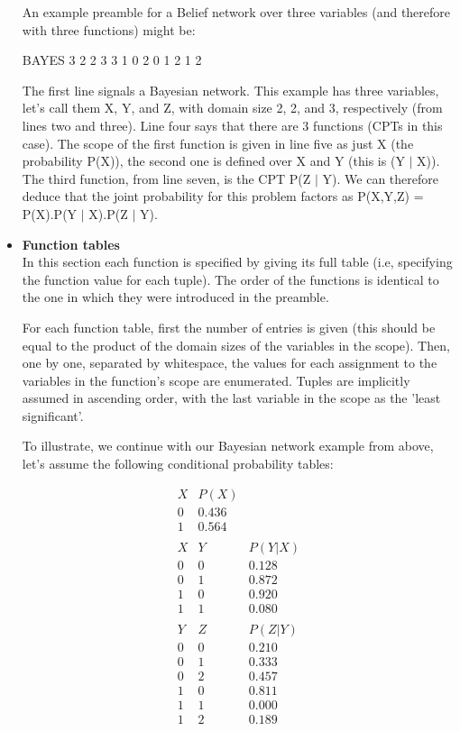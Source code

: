 \documentclass{article}
\begin{document}
\begin{itemize}
An example preamble for a Belief network over three variables (and therefore with three functions) might be:

\begin{DoxyCode}
BAYES
3
2 2 3
3
1 0
2 0 1
2 1 2
\end{DoxyCode}

The first line signals a Bayesian network. This example has three variables, let's call them X, Y, and Z, with domain size 2, 2, and 3, respectively (from lines two and three). Line four says that there are 3 functions (CPTs in this case). The scope of the first function is given in line five as just X (the probability P(X)), the second one is defined over X and Y (this is (Y $|$ X)). The third function, from line seven, is the CPT P(Z $|$ Y). We can therefore deduce that the joint probability for this problem factors as P(X,Y,Z) = P(X).P(Y $|$ X).P(Z $|$ Y).

\item {\bf Function tables}~\\

In this section each function is specified by giving its full table (i.e, specifying the function value for each tuple). The order of the functions is identical to the one in which they were introduced in the preamble.

For each function table, first the number of entries is given (this should be equal to the product of the domain sizes of the variables in the scope). Then, one by one, separated by whitespace, the values for each assignment to the variables in the function's scope are enumerated. Tuples are implicitly assumed in ascending order, with the last variable in the scope as the 'least significant'.

To illustrate, we continue with our Bayesian network example from above, let's assume the following conditional probability tables:

\begin{eqnarray*}
X & P(X) &\\
0 & 0.436 &\\
1 & 0.564 &\\
&&\\
X & Y & P(Y | X)\\
0 & 0 & 0.128\\
0 & 1 & 0.872\\
1 & 0 & 0.920\\
1 & 1 & 0.080\\
&&\\
Y & Z & P(Z | Y)\\
0 & 0 & 0.210\\
0 & 1 & 0.333\\
0 & 2 & 0.457\\
1 & 0 & 0.811\\
1 & 1 & 0.000\\
1 &	2 &	0.189\\
\end{eqnarray*}


\end{itemize}
\end{document}
